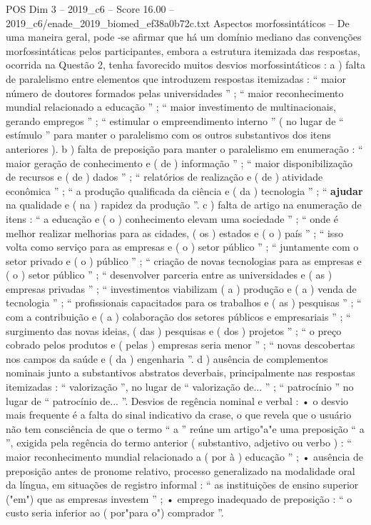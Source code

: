 \begin{textsample}{POS Dim 3 – 2019\_c6 – Score 16.00 – 2019\_c6/enade\_2019\_biomed\_ef38a0b72c.txt}
Aspectos morfossintáticos – De uma maneira geral, pode -se afirmar que há um domínio mediano das convenções morfossintáticas pelos participantes, embora a estrutura itemizada das respostas, ocorrida na Questão 2, tenha favorecido muitos desvios morfossintáticos : a ) falta de paralelismo entre elementos que introduzem respostas itemizadas : “ maior número de doutores formados pelas universidades ” ; “ maior reconhecimento mundial relacionado a educação ” ; “ maior investimento de multinacionais, gerando empregos ” ; “ estimular o empreendimento interno ” ( no lugar de “ estímulo ” para manter o paralelismo com os outros substantivos dos itens anteriores ). b ) falta de preposição para manter o paralelismo em enumeração : “ maior geração de conhecimento e ( de ) informação ” ; “ maior disponibilização de recursos e ( de ) dados ” ; “ relatórios de realização e ( de ) atividade econômica ” ; “ a produção qualificada da ciência e ( da ) tecnologia ” ; “ \textbf{ajudar} na qualidade e ( na ) rapidez da produção ”. c ) falta de artigo na enumeração de itens : “ a educação e ( o ) conhecimento elevam uma sociedade ” ; “ onde é melhor realizar melhorias para as cidades, ( os ) estados e ( o ) país ” ; “ isso volta como serviço para as empresas e ( o ) setor público ” ; “ juntamente com o setor privado e ( o ) público ” ; “ criação de novas tecnologias para as empresas e ( o ) setor público ” ; “ desenvolver parceria entre as universidades e ( as ) empresas privadas ” ; “ investimentos viabilizam ( a ) produção e ( a ) venda de tecnologia ” ; “ profissionais capacitados para os trabalhos e ( as ) pesquisas ” ; “ com a contribuição e ( a ) colaboração dos setores públicos e empresariais ” ; “ surgimento das novas ideias, ( das ) pesquisas e ( dos ) projetos ” ; “ o preço cobrado pelos produtos e ( pelas ) empresas seria menor ” ; “ novas descobertas nos campos da saúde e ( da ) engenharia ”. d ) ausência de complementos nominais junto a substantivos abstratos deverbais, principalmente nas respostas itemizadas : “ valorização ”, no lugar de “ valorização de... ” ; “ patrocínio ” no lugar de “ patrocínio de... ”.
Desvios de regência nominal e verbal : • o desvio mais frequente é a falta do sinal indicativo da crase, o que revela que o usuário não tem consciência de que o termo “ a ” reúne um artigo"a"e uma preposição “ a ”, exigida pela regência do termo anterior ( substantivo, adjetivo ou verbo ) : “ maior reconhecimento mundial relacionado a ( por à ) educação ” ; • ausência de preposição antes de pronome relativo, processo generalizado na modalidade oral da língua, em situações de registro informal : “ as instituições de ensino superior ("em") que as empresas investem ” ; • emprego inadequado de preposição : “ o custo seria inferior ao ( por"para o") comprador ”.

\end{textsample}
